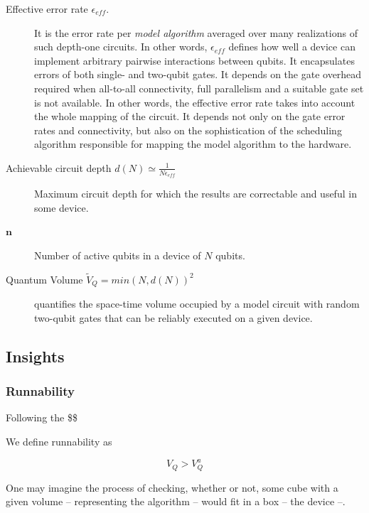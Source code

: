 \documentclass[11pt]{article}
\begin{document}
\begin{description}
\item[{Effective error rate \(\epsilon_{eff}\).}] It is the error rate per \emph{model algorithm} averaged over many realizations of such depth-one circuits. In other words, \(\epsilon_{eff}\) defines how well a device can implement arbitrary pairwise interactions between qubits. It encapsulates errors of both single- and two-qubit gates. It depends on the gate overhead required when all-to-all connectivity, full parallelism and a suitable gate set is not available. In other words, the effective error rate takes into account the whole mapping of the circuit. It depends not only on the gate error rates and connectivity, but also on the sophistication of the scheduling algorithm responsible for mapping the model algorithm to the hardware.

\item[{Achievable circuit depth \(d(N) \simeq \frac{1}{N \epsilon_{eff}}\)}] Maximum circuit depth for which the results are correctable and useful in some device.
\end{description}

\begin{description}
\item[{\(\textbf{n}\)}] Number of active qubits in a device of \(N\) qubits.

\item[{Quantum Volume \(\tilde{V}_Q = min (N, d(N))^2\)}] quantifies the space-time volume occupied by a model circuit with random two-qubit gates that can be reliably executed on a given device.
\end{description}

\subsection{Insights}
\label{sec:orgcb503ce}

\subsubsection{Runnability}
\label{sec:org4c69f8c}

Following the \$\$

We define runnability as 

$$V_Q > V_Q^a$$

One may imagine the process of checking, whether or not, some cube with a given volume -- representing the algorithm -- would fit in a box -- the device --.
\end{document}
